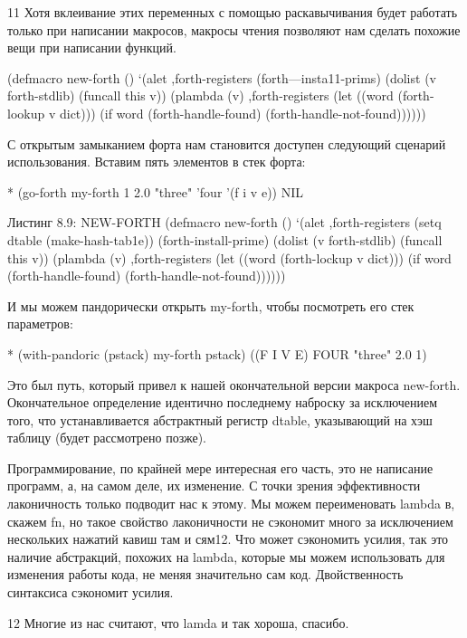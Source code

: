 11 Хотя вклеивание этих переменных с помощью раскавычивания будет работать только при написании макросов, макросы чтения позволяют нам сделать похожие вещи при написании функций.

(defmacro new-forth ()
‘(alet ,forth-registers
(forth—insta11-prims)
(dolist (v forth-stdlib)
(funcall this v))
(plambda (v) ,forth-registers
(let ((word (forth-lookup v dict)))
(if word
(forth-handle-found)
(forth-handle-not-found))))))

С открытым замыканием форта нам становится доступен следующий сценарий использования. Вставим пять элементов в стек форта:

* (go-forth my-forth
1 2.0 "three" ’four ’(f i v e))
NIL

Листинг 8.9: NEW-FORTH
(defmacro new-forth ()
‘(alet ,forth-registers
(setq dtable (make-hash-tab1e))
(forth-install-prime)
(dolist (v forth-stdlib)
(funcall this v))
(plambda (v) ,forth-registers
(let ((word (forth-lockup v dict)))
(if word
(forth-handle-found)
(forth-handle-not-found))))))

И мы можем пандорически открыть my-forth, чтобы посмотреть его стек параметров:

* (with-pandoric (pstack) my-forth
pstack)
((F I V E) FOUR "three" 2.0 1)

Это был путь, который привел к нашей окончательной версии макроса new-forth. Окончательное определение идентично последнему наброску за исключением того, что устанавливается абстрактный регистр dtable, указывающий на хэш таблицу (будет рассмотрено позже).

Программирование, по крайней мере интересная его часть, это не написание программ, а, на самом деле, их изменение. С точки зрения эффективности лаконичность только подводит нас к этому. Мы можем переименовать lambda в, скажем fn, но такое свойство лаконичности не сэкономит много за исключением нескольких нажатий кавиш там и сям12. Что может сэкономить усилия, так это наличие абстракций, похожих на lambda, которые мы можем использовать для изменения работы кода, не меняя значительно сам код. Двойственность синтаксиса сэкономит усилия. 

12 Многие из нас считают, что lamda и так хороша, спасибо.

